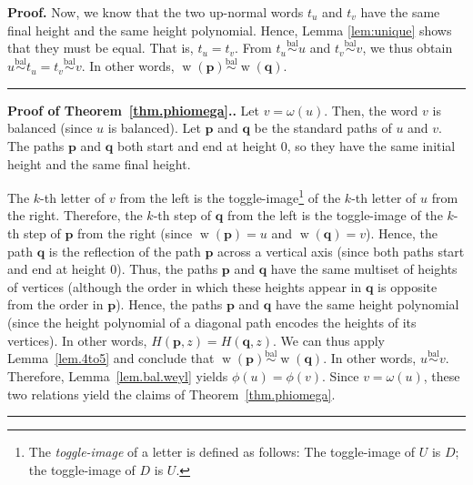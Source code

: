 \documentclass[numbers=enddot,12pt,final,onecolumn,notitlepage]{scrartcl}%
\theoremstyle{definition}
\newenvironment{proof}[1][Proof]{\noindent\textbf{#1.} }{\ \rule{0.5em}{0.5em}}
\newcommand{\pp}{\mathbf{p}}
\newcommand{\qq}{\mathbf{q}}
\newcommand{\w}{\operatorname{w}}
\newcommand{\balsim}{\overset{\operatorname*{bal}}{\sim}}
\newcommand{\tup}[1]{\left( #1 \right)}
\newenvironment{vershort}{}{}
\begin{document}
\begin{vershort}
\begin{proof}
Now, we know that the two up-normal words $t_{u}$ and $t_{v}$ have the same
final height and the same height polynomial.
Hence, Lemma \ref{lem:unique} shows that they
must be equal. That is, $t_{u}=t_{v}$.
From $t_{u} \balsim u$ and $t_{v} \balsim v$, we thus obtain
$u \balsim t_{u} = t_{v} \balsim v$.
In other words, $\w\left(  \pp\right)
\balsim \w\left(  \qq\right)
$.
\end{proof}

\begin{proof}[Proof of Theorem~\ref{thm.phiomega}.]
Let $v=\omega\left(  u\right)  $.
Then, the word $v$ is balanced (since $u$ is balanced).
Let $\pp$ and $\qq$ be the standard paths of $u$ and $v$.  
The paths $\pp$ and $\qq$ both start and end at height $0$,
so they have the same initial height and the same final height.

The $k$-th letter of $v$
from the left is the toggle-image\footnote{The \emph{toggle-image} of a letter is
defined as follows: The toggle-image of $U$ is $D$; the toggle-image of $D$ is $U$.} of
the $k$-th letter of $u$ from the right. Therefore, the $k$-th step of
$\qq$ from the left is the toggle-image
of the $k$-th step of
$\pp$ from the right (since $\w\left(  \pp\right)  =u$ and
$\w\left(  \qq\right)  =v$). Hence, the path $\qq$ is the
reflection of the path $\pp$ across a vertical axis (since both paths
start and end at height $0$).
Thus, the paths $\pp$ and $\qq$
have the same multiset of heights of vertices (although the order in which
these heights appear in $\qq$ is opposite from the order in
$\pp$).
Hence, the paths $\pp$ and $\qq$ have the same height polynomial (since the height polynomial of a diagonal path encodes the heights of its vertices).
In other words, $H\tup{\pp, z} = H\tup{\qq, z}$.
We can thus apply Lemma~\ref{lem.4to5} and conclude that $\w\tup{\pp} \balsim \w\tup{\qq}$.
In other words, $u \balsim v$.
Therefore, Lemma~\ref{lem.bal.weyl} yields
$\phi\tup{u} = \phi\tup{v}$.
Since $v = \omega\tup{u}$, these two relations
yield the claims of Theorem~\ref{thm.phiomega}.
\end{proof}
\end{vershort}
\end{document}
